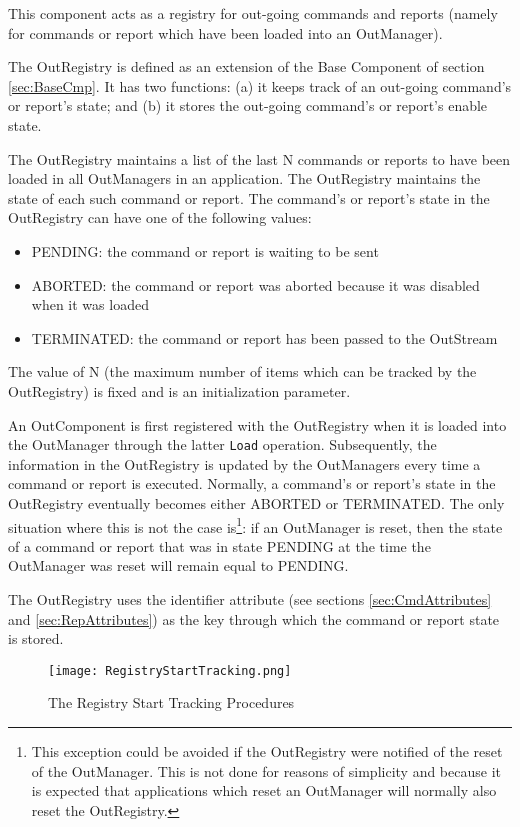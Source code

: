 This component acts as a registry for out-going commands and reports (namely for commands or report which have been loaded into an OutManager).

The OutRegistry is defined as an extension of the Base Component of section \ref{sec:BaseCmp}. It has two functions: (a) it keeps track of an out-going command's or report's state; and (b) it stores the out-going command's or report's enable state.

The OutRegistry maintains a list of the last N commands or reports to have been loaded in all OutManagers in an application. The OutRegistry maintains the state of each such command or report. The command's or report's state in the OutRegistry can have one of the following values:
\begin{itemize}
\item PENDING: the command or report is waiting to be sent
\item ABORTED: the command or report was aborted because it was disabled when it was loaded
\item TERMINATED: the command or report has been passed to the OutStream
\end{itemize}
The value of N (the maximum number of items which can be tracked by the OutRegistry) is fixed and is an initialization parameter.

An OutComponent is first registered with the OutRegistry when it is loaded into the OutManager through the latter \texttt{Load} operation. Subsequently, the information in the OutRegistry is updated by the OutManagers every time a command or report is executed. Normally, a command's or report's state in the OutRegistry eventually becomes either ABORTED or TERMINATED. The only situation where this is not the case is\footnote{This exception could be avoided if the OutRegistry were notified of the reset of the OutManager. This is not done for reasons of simplicity and because it is expected that applications which reset an OutManager will normally also reset the OutRegistry.}: if an OutManager is reset, then the state of a command or report that was in state PENDING at the time the OutManager was reset will remain equal to PENDING.

The OutRegistry uses the identifier attribute (see sections \ref{sec:CmdAttributes} and \ref{sec:RepAttributes}) as the key through which the command or report state is stored.

\begin{figure}[h]
 \centering
 \texttt{[image: RegistryStartTracking.png]}
 \caption{The Registry Start Tracking Procedures}
 \label{fig:RegistryStartTracking}
\end{figure}

